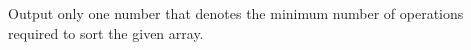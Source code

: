 Output only one number that denotes the minimum number of operations 
required to sort the given array.
